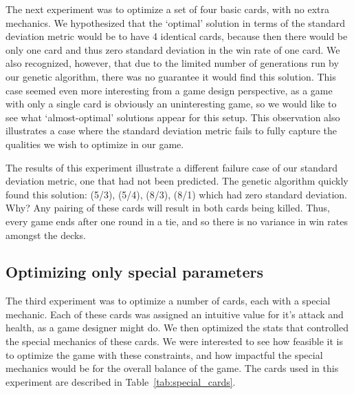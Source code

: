 The next experiment was to optimize a set of four basic cards, with no extra mechanics. We hypothesized that the `optimal' solution in terms of the standard deviation metric would be to have 4 identical cards, because then there would be only one card and thus zero standard deviation in the win rate of one card. We also recognized, however, that due to the limited number of generations run by our genetic algorithm, there was no guarantee it would find this solution. This case seemed even more interesting from a game design perspective, as a game with only a single card is obviously an uninteresting game, so we would like to see what `almost-optimal' solutions appear for this setup. This observation also illustrates a case where the standard deviation metric fails to fully capture the qualities we wish to optimize in our game.

The results of this experiment illustrate a different failure case of our standard deviation metric, one that had not been predicted. The genetic algorithm quickly found this solution: (5/3), (5/4), (8/3), (8/1) which had zero standard deviation. Why? Any pairing of these cards will result in both cards being killed. Thus, every game ends after one round in a tie, and so there is no variance in win rates amongst the decks. 

 \subsection{Optimizing only special parameters}

The third experiment was to optimize a number of cards, each with a special mechanic. Each of these cards was assigned an intuitive value for it's attack and health, as a game designer might do. We then optimized the stats that controlled the special mechanics of these cards. We were interested to see how feasible it is to optimize the game with these constraints, and how impactful the special mechanics would be for the overall balance of the game. The cards used in this experiment are described in Table~\ref{tab:special_cards}.

